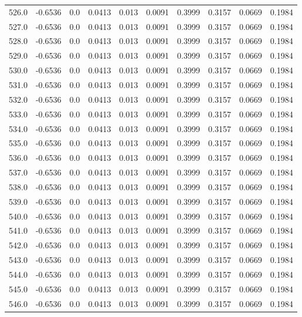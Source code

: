 \begin{longtable}{lrrrrrrrrr}
526.0 & -0.6536 & 0.0 & 0.0413 & 0.013 & 0.0091 & 0.3999 & 0.3157 & 0.0669 & 0.1984 \\
527.0 & -0.6536 & 0.0 & 0.0413 & 0.013 & 0.0091 & 0.3999 & 0.3157 & 0.0669 & 0.1984 \\
528.0 & -0.6536 & 0.0 & 0.0413 & 0.013 & 0.0091 & 0.3999 & 0.3157 & 0.0669 & 0.1984 \\
529.0 & -0.6536 & 0.0 & 0.0413 & 0.013 & 0.0091 & 0.3999 & 0.3157 & 0.0669 & 0.1984 \\
530.0 & -0.6536 & 0.0 & 0.0413 & 0.013 & 0.0091 & 0.3999 & 0.3157 & 0.0669 & 0.1984 \\
531.0 & -0.6536 & 0.0 & 0.0413 & 0.013 & 0.0091 & 0.3999 & 0.3157 & 0.0669 & 0.1984 \\
532.0 & -0.6536 & 0.0 & 0.0413 & 0.013 & 0.0091 & 0.3999 & 0.3157 & 0.0669 & 0.1984 \\
533.0 & -0.6536 & 0.0 & 0.0413 & 0.013 & 0.0091 & 0.3999 & 0.3157 & 0.0669 & 0.1984 \\
534.0 & -0.6536 & 0.0 & 0.0413 & 0.013 & 0.0091 & 0.3999 & 0.3157 & 0.0669 & 0.1984 \\
535.0 & -0.6536 & 0.0 & 0.0413 & 0.013 & 0.0091 & 0.3999 & 0.3157 & 0.0669 & 0.1984 \\
536.0 & -0.6536 & 0.0 & 0.0413 & 0.013 & 0.0091 & 0.3999 & 0.3157 & 0.0669 & 0.1984 \\
537.0 & -0.6536 & 0.0 & 0.0413 & 0.013 & 0.0091 & 0.3999 & 0.3157 & 0.0669 & 0.1984 \\
538.0 & -0.6536 & 0.0 & 0.0413 & 0.013 & 0.0091 & 0.3999 & 0.3157 & 0.0669 & 0.1984 \\
539.0 & -0.6536 & 0.0 & 0.0413 & 0.013 & 0.0091 & 0.3999 & 0.3157 & 0.0669 & 0.1984 \\
540.0 & -0.6536 & 0.0 & 0.0413 & 0.013 & 0.0091 & 0.3999 & 0.3157 & 0.0669 & 0.1984 \\
541.0 & -0.6536 & 0.0 & 0.0413 & 0.013 & 0.0091 & 0.3999 & 0.3157 & 0.0669 & 0.1984 \\
542.0 & -0.6536 & 0.0 & 0.0413 & 0.013 & 0.0091 & 0.3999 & 0.3157 & 0.0669 & 0.1984 \\
543.0 & -0.6536 & 0.0 & 0.0413 & 0.013 & 0.0091 & 0.3999 & 0.3157 & 0.0669 & 0.1984 \\
544.0 & -0.6536 & 0.0 & 0.0413 & 0.013 & 0.0091 & 0.3999 & 0.3157 & 0.0669 & 0.1984 \\
545.0 & -0.6536 & 0.0 & 0.0413 & 0.013 & 0.0091 & 0.3999 & 0.3157 & 0.0669 & 0.1984 \\
546.0 & -0.6536 & 0.0 & 0.0413 & 0.013 & 0.0091 & 0.3999 & 0.3157 & 0.0669 & 0.1984 \\

\end{longtable}

